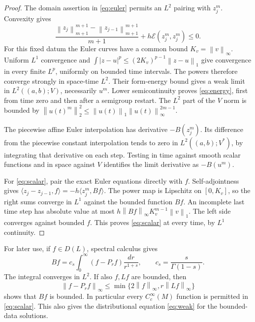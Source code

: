 \documentclass[11pt]{article}
\theoremstyle{remark}
\newcommand{\E}{\mathcal E}
\newcommand{\norm}[1]{\left\lVert#1\right\rVert}
\begin{document}
\begin{proof}
The domain assertion in \eqref{eq:euler} permits an $L^2$ pairing with
$z_j^m$. Convexity gives
\[
 \frac{\norm{z_j}_{m+1}^{m+1}-\norm{z_{j-1}}_{m+1}^{m+1}}{m+1}
       +h\E(z_j^m,z_j^m)\le0.
\]
For this fixed datum the Euler curves have a common bound
$K_v=\norm v_\infty$. Uniform $L^1$ convergence and
$\int|z-u|^p\le(2K_v)^{p-1}\norm{z-u}_1$ give convergence in every finite
$L^p$, uniformly on bounded time intervals. The powers therefore converge
strongly in space-time $L^2$. Their form-energy bound gives a weak limit
in $L^2((a,b);V)$, necessarily $u^m$. Lower semicontinuity proves
\eqref{eq:energy}, first from time zero and then after a semigroup restart.
The $L^2$ part of the $V$ norm is bounded by
$\norm{u(t)^m}_2^2\le\norm{u(t)}_1\norm{u(t)}_\infty^{2m-1}$.

The piecewise affine Euler interpolation has derivative $-B(z_j^m)$.
Its difference from the piecewise constant interpolation tends to zero
in $L^2((a,b);V^*)$, by integrating that derivative on each step.
Testing in time against smooth scalar functions and in space against $V$
identifies the limit derivative as $-B(u^m)$.

For \eqref{eq:scalar}, pair the exact Euler equations directly with $f$.
Self-adjointness gives
$\langle z_j-z_{j-1},f\rangle=-h\langle z_j^m,Bf\rangle$.
The power map is Lipschitz on $[0,K_v]$, so the right sums converge in
$L^1$ against the bounded function $Bf$. An incomplete last time step
has absolute value at most
$h\norm{Bf}_\infty K_v^{m-1}\norm v_1$.
The left side converges against bounded $f$. This proves
\eqref{eq:scalar} at every time, by $L^1$ continuity.
\end{proof}

For later use, if $f\in D(L)$, spectral calculus gives
\begin{equation}\label{eq:fractional}
 Bf=c_s\int_0^\infty(f-P_rf)\frac{dr}{r^{1+s}},
 \qquad c_s=\frac{s}{\Gamma(1-s)}.
\end{equation}
The integral converges in $L^2$. If also $f,Lf$ are bounded, then
\[
 \norm{f-P_rf}_\infty
 \le\min\{2\norm f_\infty,r\norm{Lf}_\infty\}
\]
shows that $Bf$ is bounded. In particular every $C_c^\infty(M)$ function
is permitted in \eqref{eq:scalar}. This also gives the distributional
equation \eqref{eq:weak} for the bounded-data solutions.
\end{document}
